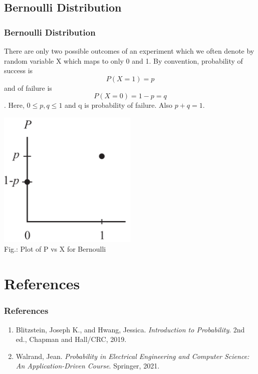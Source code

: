 \documentclass{beamer}
\begin{document}
\subsection{Bernoulli Distribution}
\begin{frame}
    \frametitle{Bernoulli Distribution}
    There are only two possible outcomes of an experiment which we often denote by random variable X which maps to only 0 and 1. By convention, probability of success is 
    $$P(X = 1) = p $$
    and of failure is 
    $$P(X = 0) = 1-p = q$$.
    Here, $0 \leq p,q \leq 1$ and q is probability of failure. Also $p+q =1$.
\end{frame}

\begin{frame}
    \includegraphics[width=0.5\textwidth]{bern.png}
    \\
    Fig.: Plot of P vs X for Bernoulli
\end{frame}
\section{References}
\begin{frame}
    \frametitle{References}
    \begin{enumerate}
        \item Blitzstein, Joseph K., and  Hwang, Jessica. \textit{Introduction to Probability}. 2nd ed., Chapman and Hall/CRC, 2019.
        \item Walrand, Jean. \textit{Probability in Electrical Engineering and Computer Science: An Application-Driven Course}. Springer, 2021.
    \end{enumerate}
\end{frame}
\end{document}
